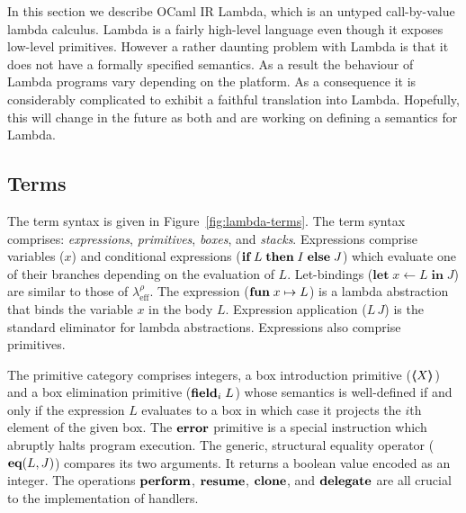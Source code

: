 \documentclass[12pt,mscres,cdtppar,twoside,openright,logo,rightchapter,normalheadings]{infthesis}
\theoremstyle{definition}
\newcommand{\Calc}{\ensuremath{\lambda_{\text{eff}}^\rho}\xspace}
\newcommand{\revto}{\ensuremath{\leftarrow}}
\newcommand{\keyw}[1]{\textbf{#1}}
\newcommand{\Let}{\keyw{let}}
\newcommand{\In}{\keyw{in}}
\begin{document}
In this section we describe OCaml IR Lambda, which is an untyped
call-by-value lambda calculus. Lambda is a fairly high-level language
even though it exposes low-level primitives. However a rather daunting
problem with Lambda is that it does not have a formally specified
semantics. As a result the behaviour of Lambda programs vary depending
on the platform. As a consequence it is considerably complicated to
exhibit a faithful translation into Lambda. Hopefully, this will
change in the future as both \cite{Dolan2016} and \cite{Chambert2016}
are working on defining a semantics for Lambda.


\subsection{Terms} 
The term syntax is given in Figure~\ref{fig:lambda-terms}. The term
syntax comprises: \emph{expressions}, \emph{primitives}, \emph{boxes},
and \emph{stacks}. Expressions comprise variables ($x$) and
conditional expressions ($\If\; L \; \Then\; I\; \Else\; J$) which
evaluate one of their branches depending on the evaluation of
$L$. Let-bindings ($\Let\; x \revto L\; \In \; J$) are similar to
those of \Calc. The expression ($\Fun \; x \mapsto L$) is a lambda
abstraction that binds the variable $x$ in the body $L$. Expression
application ($L\,J$) is the standard eliminator for lambda
abstractions. Expressions also comprise primitives.

The primitive category comprises integers, a box introduction
primitive ($\langle\!\!\langle X \rangle\!\!\rangle$) and a box elimination primitive ($\Field_i\;L$)
whose semantics is well-defined if and only if the expression $L$
evaluates to a box in which case it projects the $i$th element of the
given box.  The $\Error$ primitive is a special instruction which
abruptly halts program execution. The generic, structural equality
operator ($\Eq(L,J)$) compares its two arguments. It returns a boolean
value encoded as an integer. The operations $\Perform$, $\Resume$,
$\Clone$, and $\Delegate$ are all crucial to the implementation of
handlers.
\end{document}
